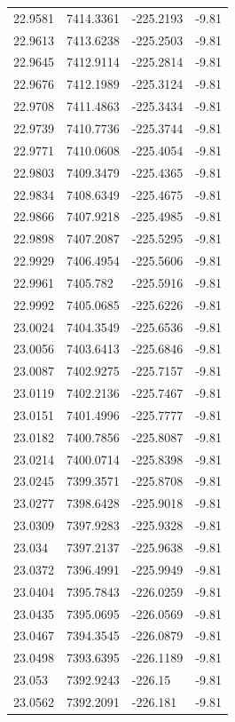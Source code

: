 \begin{table}[H]
\begin{tabular}{llll}
22.9581 & 7414.3361 & -225.2193 & -9.81 \\
22.9613 & 7413.6238 & -225.2503 & -9.81 \\
22.9645 & 7412.9114 & -225.2814 & -9.81 \\
22.9676 & 7412.1989 & -225.3124 & -9.81 \\
22.9708 & 7411.4863 & -225.3434 & -9.81 \\
22.9739 & 7410.7736 & -225.3744 & -9.81 \\
22.9771 & 7410.0608 & -225.4054 & -9.81 \\
22.9803 & 7409.3479 & -225.4365 & -9.81 \\
22.9834 & 7408.6349 & -225.4675 & -9.81 \\
22.9866 & 7407.9218 & -225.4985 & -9.81 \\
22.9898 & 7407.2087 & -225.5295 & -9.81 \\
22.9929 & 7406.4954 & -225.5606 & -9.81 \\
22.9961 & 7405.782 & -225.5916 & -9.81 \\
22.9992 & 7405.0685 & -225.6226 & -9.81 \\
23.0024 & 7404.3549 & -225.6536 & -9.81 \\
23.0056 & 7403.6413 & -225.6846 & -9.81 \\
23.0087 & 7402.9275 & -225.7157 & -9.81 \\
23.0119 & 7402.2136 & -225.7467 & -9.81 \\
23.0151 & 7401.4996 & -225.7777 & -9.81 \\
23.0182 & 7400.7856 & -225.8087 & -9.81 \\
23.0214 & 7400.0714 & -225.8398 & -9.81 \\
23.0245 & 7399.3571 & -225.8708 & -9.81 \\
23.0277 & 7398.6428 & -225.9018 & -9.81 \\
23.0309 & 7397.9283 & -225.9328 & -9.81 \\
23.034 & 7397.2137 & -225.9638 & -9.81 \\
23.0372 & 7396.4991 & -225.9949 & -9.81 \\
23.0404 & 7395.7843 & -226.0259 & -9.81 \\
23.0435 & 7395.0695 & -226.0569 & -9.81 \\
23.0467 & 7394.3545 & -226.0879 & -9.81 \\
23.0498 & 7393.6395 & -226.1189 & -9.81 \\
23.053 & 7392.9243 & -226.15 & -9.81 \\
23.0562 & 7392.2091 & -226.181 & -9.81 \\

\end{tabular}
\end{table}
